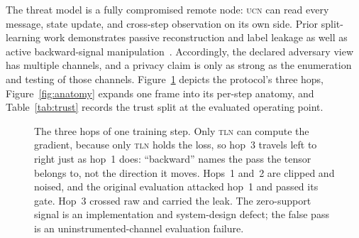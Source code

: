 \documentclass[11pt]{article}
\newcommand{\tln}{\textsc{tln}}
\newcommand{\ucn}{\textsc{ucn}}
\begin{document}
\begin{table}[H]
\caption{Experimental setup for the main configuration and for the replication
and mitigation runs. Full fingerprints identify the exact model
weights and corpus used by the evaluated runner.}
\label{tab:setup}
\end{table}

The threat model is a fully compromised remote node: \ucn{} can read every
message, state update, and cross-step observation on its own side. Prior split-learning
work demonstrates passive reconstruction and label leakage as well as active
backward-signal manipulation~\cite{erdogan2022unsplit,li2022labelleakage,pasquini2021tiger}.
Accordingly, the declared adversary view has multiple channels, and a privacy
claim is only as strong as the enumeration and testing of those channels.
Figure~\ref{fig:twowire} depicts the protocol's three hops,
Figure~\ref{fig:anatomy} expands one frame into its per-step anatomy, and
Table~\ref{tab:trust} records the trust split at the evaluated operating point.

\begin{figure}[H]
\centering
{}
\caption{The three hops of one training step. Only \tln{} can compute the
gradient, because only \tln{} holds the loss, so hop~3 travels left to right
just as hop~1 does: ``backward'' names the pass the tensor belongs to, not the
direction it moves. Hops~1 and~2 are clipped and noised, and the original
evaluation attacked hop~1 and passed its gate. Hop~3 crossed raw and carried the
leak. The zero-support signal is an implementation and system-design defect; the
false pass is an uninstrumented-channel evaluation failure.}
\label{fig:twowire}
\end{figure}
\end{document}
